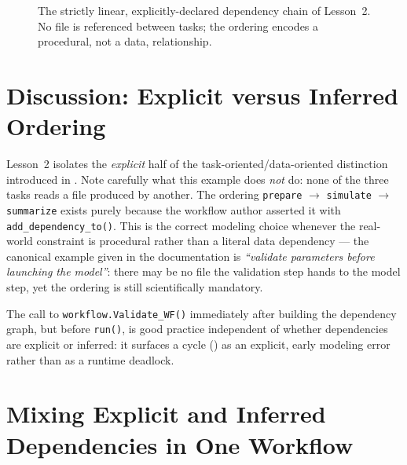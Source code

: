 \begin{figure}[h]
\centering
{}
\caption{The strictly linear, explicitly-declared dependency chain of
Lesson~2. No file is referenced between tasks; the ordering encodes a
procedural, not a data, relationship.}
\label{fig:lesson02-chain}
\end{figure}

\section{Discussion: Explicit versus Inferred Ordering}

Lesson~2 isolates the \emph{explicit} half of the task-oriented/data-oriented
distinction introduced in . Note carefully what this
example does \emph{not} do: none of the three tasks reads a file produced by
another. The ordering \texttt{prepare} $\to$ \texttt{simulate} $\to$
\texttt{summarize} exists purely because the workflow author asserted it with
\texttt{add\_dependency\_to()}. This is the correct modeling choice whenever
the real-world constraint is procedural rather than a literal data
dependency --- the canonical example given in the documentation is
\emph{``validate parameters before launching the model''}: there may be no
file the validation step hands to the model step, yet the ordering is still
scientifically mandatory.

The call to \texttt{workflow.Validate\_WF()} immediately after building the
dependency graph, but before \texttt{run()}, is good practice independent of
whether dependencies are explicit or inferred: it surfaces a cycle
() as an explicit, early modeling error rather than as a
runtime deadlock.

\section{Mixing Explicit and Inferred Dependencies in One Workflow}

